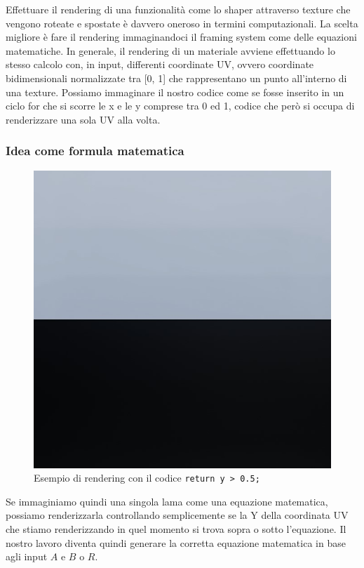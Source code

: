 \documentclass[main.tex]{subfiles}
\begin{document}
Effettuare il rendering di una funzionalità come lo shaper attraverso texture che vengono roteate e spostate è davvero oneroso in termini computazionali. La scelta migliore è fare il rendering immaginandoci il framing system come delle equazioni matematiche. In generale, il rendering di un materiale avviene effettuando lo stesso calcolo con, in input, differenti coordinate UV, ovvero coordinate bidimensionali normalizzate tra [0, 1] che rappresentano un punto all'interno di una texture. Possiamo immaginare il nostro codice come se fosse inserito in un ciclo for che si scorre  le x e le y comprese tra 0 ed 1, codice che però si occupa di renderizzare una sola UV alla volta. 

\clearpage %
\subsubsection{Idea come formula matematica}\label{subsec:5_1_ShaperMath}
\begin{figure}
    \centering
    \captionsetup{justification=centering}
    \includegraphics[scale=0.35]{img/newFeatures/eqExample.jpg}
    \caption{Esempio di rendering con il codice \lstinline{return y > 0.5;}}
    \label{fig:5_eqExample}
\end{figure}
Se immaginiamo quindi una singola lama come una equazione matematica, possiamo renderizzarla controllando semplicemente se la Y della coordinata UV che stiamo renderizzando in quel momento si trova sopra o sotto l'equazione. Il nostro lavoro diventa quindi generare la corretta equazione matematica in base agli input $A$ e $B$ o $R$.
\end{document}

